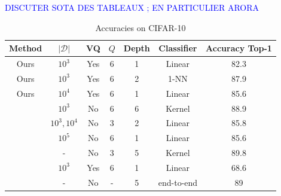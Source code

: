 \documentclass{article}
\newcommand{\Edouard}[1]{\textcolor{blue}{#1}}
\begin{document}
\Edouard{DISCUTER SOTA DES TABLEAUX ; EN PARTICULIER ARORA}

\begin{table}[h]
  \caption{Accuracies on CIFAR-10}
  \label{accuracy}
  \centering
  \begin{tabular}{|c|c|c|c|c|c|c|}
    \hline 
    Method&$|\mathcal{D}|$&VQ&$Q$&Depth &Classifier& Accuracy Top-1 \\
    \hline 
    \hline 
    Ours&$10^3$ & Yes&6&1&Linear&82.3 \\
    \hline
    Ours&$10^3$ & Yes& 6&2&1-NN&87.9\\
    \hline 
    Ours&$10^4$ & Yes&6&1&Linear&85.6\\
    \hline 
    \cite{li2019enhanced}&$10^3$& No&6&6&Kernel &88.9\\
    \hline 
    \cite{mairal2016end}&$10^3, 10^4$& No&3 & 2& Linear &85.8\\
    \hline 
    \cite{recht2019imagenet}&$10^5$ & No& 6&1&Linear &85.6\\
    \hline 
    \cite{shankar2020neural}&-& No&3&5&Kernel &89.8\\
    \hline 
    \cite{coates2011analysis}&$10^3$& Yes&6 & 1&Linear &68.6\\
    \hline
    \cite{krizhevsky2012imagenet}&-& No&-&5&end-to-end&89\\
    \hline
  \end{tabular}
\end{table}
\end{document}
